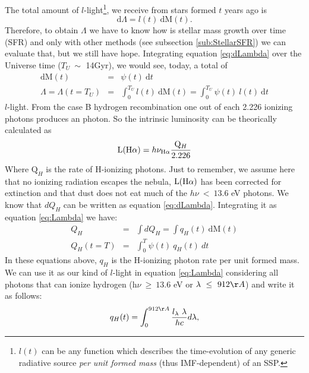 \documentclass[a4paper,11pt]{article}
\begin{document}
The total amount of $l$-light\footnote{$l(t)$ can be any function which describes the time-evolution
of any generic radiative source \emph{per unit formed mass} (thus IMF-dependent) of an SSP.}, we
receive from stars formed $t$ years ago is
\begin{equation}
	\mathrm{d}\Lambda = l(t)\ \mathrm{d}\mathrm{M}(t).
	\label{eq:dLambda}
\end{equation}
\noindent Therefore, to obtain $\Lambda$ we have to know how is stellar mass growth over time (SFR) and only with other methods (see subsection \ref{sub:StellarSFR}) we can evaluate that, but we still have hope. Integrating equation \eqref{eq:dLambda} over the Universe time ($T_U\ \sim$ 14Gyr), we would see, today, a total of
\begin{eqnarray}
	\mathrm{d}\mathrm{M}(t) &=& \psi(t)\ \mathrm{d}t \\
	\Lambda = \Lambda(t = T_U) &=& \int_0^{T_U} l(t)\ \textrm{d}\textrm{M}(t) = \int_0^{T_U} \psi(t)\ l(t)\ \textrm{d}t
	\label{eq:Lambda}
\end{eqnarray}
\noindent $l$-light. 
From the case B hydrogen recombination one out of each 2.226 ionizing photons produces an \Halpha photon. So the intrinsic \Halpha luminosity can be theorically calculated as
\begin{equation}
	\mathrm{L}(\Halpha) = h \nu_{\Halpha} \frac{\mathrm{Q}_H}{2.226}
	\label{eq:LHa_recomb_theory}
\end{equation}
Where $\mathrm{Q}_H$ is the rate of H-ionizing photons. Just to remember, we assume here that no ionizing radiation escapes the nebula, $\mathrm{L}(\Halpha)$ has been corrected for extinction and that dust does not eat much of the $h\nu\ <\ 13.6$ eV photons. We know that $dQ_H$ can be written as equation \eqref{eq:dLambda}. Integrating it as equation \eqref{eq:Lambda} we have:
\begin{eqnarray}
	Q_H &=& \int dQ_H = \int q_H(t)\ \mathrm{d}\mathrm{M}(t) \\ 
	Q_H(t = T) &=& \int_0^T \psi(t)\ q_H(t)\ dt
	\label{eq:QH}
\end{eqnarray}
\noindent In these equations above, $q_H$ is the H-ionizing photon rate per unit formed mass. We can use it as our kind of $l$-light in equation \eqref{eq:Lambda} considering all photons that can ionize hydrogen (h$\nu\ \geq\ 13.6$ eV or $\lambda\ \leq\ 912\AA$) and write it as follows:
\begin{equation}
	q_H(t) = \int_0^{912\AA} \frac{l_\lambda\ \lambda}{h c} d\lambda,
	\label{eq:qH}
\end{equation}
\end{document}
